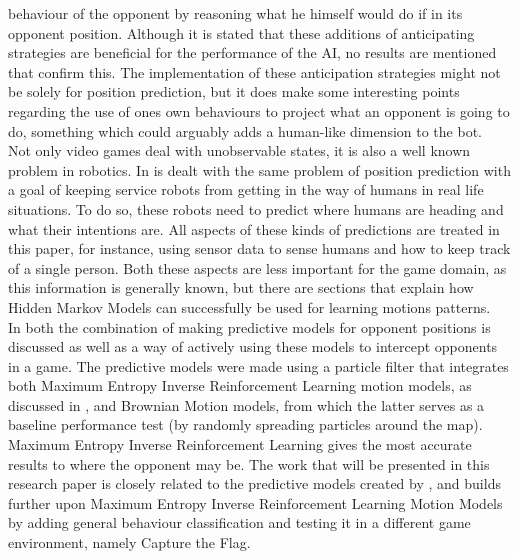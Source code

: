 \documentclass{article}
\begin{document}
behaviour of the opponent by reasoning what he himself would do if in its
opponent position. Although it is stated that these additions of anticipating strategies
are beneficial for the performance of the AI, no results are mentioned that confirm this. The implementation of these anticipation
strategies might not be solely for
position prediction, but it does make some interesting points regarding the use
of ones own behaviours to project what an opponent is going to do, something
which could arguably adds a human-like dimension to the bot.
\\
Not only video games deal with unobservable states, it is also a well known
problem in robotics. In \citep{Bennewitz05learningmotion} is dealt with the same problem of position
prediction with a goal of
keeping service robots from getting in the way of humans in real life
situations. To do so, these robots need to predict where humans are heading and what their
intentions are. All aspects of these kinds of predictions are treated in this
paper, for instance, using sensor data to sense humans and how to keep track of
a single person. Both these aspects are less important for the game domain,
as this information is generally known, but there are sections that explain how
Hidden Markov Models can successfully be used for learning motions patterns.
\\
In \citep{6374144} both the combination of making predictive models for opponent
positions is discussed as well as a way of actively using these models to intercept
opponents in a game. The predictive models were made using a particle filter
that integrates both Maximum Entropy Inverse Reinforcement Learning motion
models, as discussed in
\citep{Ziebart_2008_6055},
 and Brownian Motion models, from
which the latter serves as a baseline performance test (by randomly spreading
particles around the map). Maximum Entropy Inverse Reinforcement Learning gives
the most accurate results to where the opponent may be. The work that will be
presented in this research paper is closely
related to the predictive models created by \citep{6374144}, and builds further
upon Maximum Entropy Inverse Reinforcement Learning Motion Models by adding general behaviour
classification and testing it in a different game environment, namely Capture
the Flag.


\end{document}
